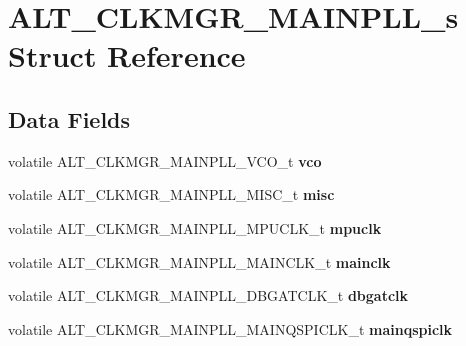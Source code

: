 \hypertarget{structALT__CLKMGR__MAINPLL__s}{}\section{A\+L\+T\+\_\+\+C\+L\+K\+M\+G\+R\+\_\+\+M\+A\+I\+N\+P\+L\+L\+\_\+s Struct Reference}
\label{structALT__CLKMGR__MAINPLL__s}
\subsection*{Data Fields}
\begin{DoxyCompactItemize}
\item 
\mbox{\label{structALT__CLKMGR__MAINPLL__s_a8e0a49dd3f50a0d363eb7ca097e8e161}} 
volatile A\+L\+T\+\_\+\+C\+L\+K\+M\+G\+R\+\_\+\+M\+A\+I\+N\+P\+L\+L\+\_\+\+V\+C\+O\+\_\+t {\bfseries vco}
\item 
\mbox{\label{structALT__CLKMGR__MAINPLL__s_ae72fa7a4f4bd6bcd916a236b660f1007}} 
volatile A\+L\+T\+\_\+\+C\+L\+K\+M\+G\+R\+\_\+\+M\+A\+I\+N\+P\+L\+L\+\_\+\+M\+I\+S\+C\+\_\+t {\bfseries misc}
\item 
\mbox{\label{structALT__CLKMGR__MAINPLL__s_a43bba93cc3e6621d2161a1c2f3e0d3ce}} 
volatile A\+L\+T\+\_\+\+C\+L\+K\+M\+G\+R\+\_\+\+M\+A\+I\+N\+P\+L\+L\+\_\+\+M\+P\+U\+C\+L\+K\+\_\+t {\bfseries mpuclk}
\item 
\mbox{\label{structALT__CLKMGR__MAINPLL__s_a1947f5bbe1b76a02eccc02c2517c0166}} 
volatile A\+L\+T\+\_\+\+C\+L\+K\+M\+G\+R\+\_\+\+M\+A\+I\+N\+P\+L\+L\+\_\+\+M\+A\+I\+N\+C\+L\+K\+\_\+t {\bfseries mainclk}
\item 
\mbox{\label{structALT__CLKMGR__MAINPLL__s_ab6e50f39a9a99afae661f376921d851a}} 
volatile A\+L\+T\+\_\+\+C\+L\+K\+M\+G\+R\+\_\+\+M\+A\+I\+N\+P\+L\+L\+\_\+\+D\+B\+G\+A\+T\+C\+L\+K\+\_\+t {\bfseries dbgatclk}
\item 
\mbox{\label{structALT__CLKMGR__MAINPLL__s_a2deb76a4dffcd7604819238bbf4ca0b4}} 
volatile A\+L\+T\+\_\+\+C\+L\+K\+M\+G\+R\+\_\+\+M\+A\+I\+N\+P\+L\+L\+\_\+\+M\+A\+I\+N\+Q\+S\+P\+I\+C\+L\+K\+\_\+t {\bfseries mainqspiclk}
\item 

\end{DoxyCompactItemize}
